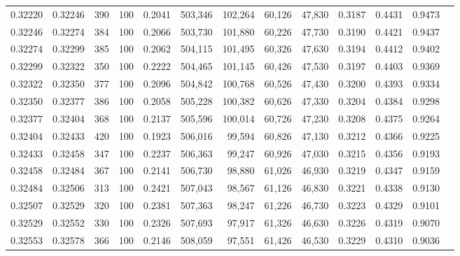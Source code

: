 \begin{tabular}{rrrrrrrrrrrrr}
0.32220 & 0.32246 &   390 & 100 &                                     0.2041 & 503,346 & 102,264 &  60,126 &  47,830 & 0.3187 & 0.4431 & 0.9473 \\
0.32246 & 0.32274 &   384 & 100 &                                     0.2066 & 503,730 & 101,880 &  60,226 &  47,730 & 0.3190 & 0.4421 & 0.9437 \\
0.32274 & 0.32299 &   385 & 100 &                                     0.2062 & 504,115 & 101,495 &  60,326 &  47,630 & 0.3194 & 0.4412 & 0.9402 \\
0.32299 & 0.32322 &   350 & 100 &                                     0.2222 & 504,465 & 101,145 &  60,426 &  47,530 & 0.3197 & 0.4403 & 0.9369 \\
0.32322 & 0.32350 &   377 & 100 &                                     0.2096 & 504,842 & 100,768 &  60,526 &  47,430 & 0.3200 & 0.4393 & 0.9334 \\
0.32350 & 0.32377 &   386 & 100 &                                     0.2058 & 505,228 & 100,382 &  60,626 &  47,330 & 0.3204 & 0.4384 & 0.9298 \\
0.32377 & 0.32404 &   368 & 100 &                                     0.2137 & 505,596 & 100,014 &  60,726 &  47,230 & 0.3208 & 0.4375 & 0.9264 \\
0.32404 & 0.32433 &   420 & 100 &                                     0.1923 & 506,016 &  99,594 &  60,826 &  47,130 & 0.3212 & 0.4366 & 0.9225 \\
0.32433 & 0.32458 &   347 & 100 &                                     0.2237 & 506,363 &  99,247 &  60,926 &  47,030 & 0.3215 & 0.4356 & 0.9193 \\
0.32458 & 0.32484 &   367 & 100 &                                     0.2141 & 506,730 &  98,880 &  61,026 &  46,930 & 0.3219 & 0.4347 & 0.9159 \\
0.32484 & 0.32506 &   313 & 100 &                                     0.2421 & 507,043 &  98,567 &  61,126 &  46,830 & 0.3221 & 0.4338 & 0.9130 \\
0.32507 & 0.32529 &   320 & 100 &                                     0.2381 & 507,363 &  98,247 &  61,226 &  46,730 & 0.3223 & 0.4329 & 0.9101 \\
0.32529 & 0.32552 &   330 & 100 &                                     0.2326 & 507,693 &  97,917 &  61,326 &  46,630 & 0.3226 & 0.4319 & 0.9070 \\
0.32553 & 0.32578 &   366 & 100 &                                     0.2146 & 508,059 &  97,551 &  61,426 &  46,530 & 0.3229 & 0.4310 & 0.9036 \\

\end{tabular}
